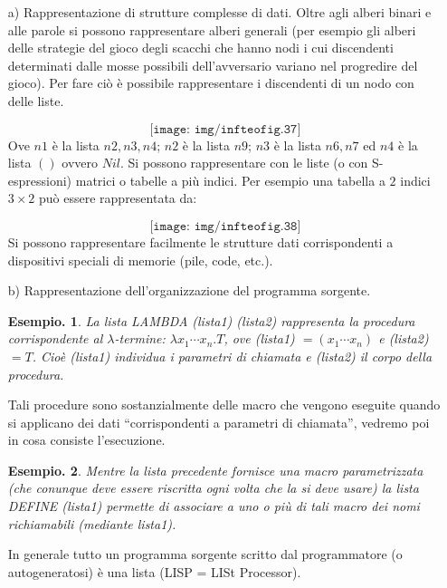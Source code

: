 \documentclass{book}
\newtheorem{esempio}{Esempio.}
\newcommand*{\lbt}{$\lambda$-ter\-mi\-ne}
\begin{document}
\begin{itemize}
\item[a)]Rappresentazione di strutture complesse di dati. Oltre agli alberi 
binari e alle parole si possono rappresentare alberi generali (per esempio gli 
alberi delle strategie del gioco degli scacchi che hanno nodi i cui discendenti
determinati dalle mosse possibili dell'avversario variano nel progredire del 
gioco). Per fare ci\`o \`e possibile rappresentare i discendenti di un nodo con
delle liste.

\[\texttt{[image: img/infteofig.37]}\]
Ove $n1$ \`e la lista $n2,n3,n4$; $n2$ \`e la lista $n9$; $n3$ \`e la lista 
$n6,n7$ ed $n4$ \`e la lista $()$ ovvero $Nil$.
Si possono rappresentare con le liste (o con S-espressioni) matrici o tabelle 
a pi\`u indici. Per esempio una tabella a $2$ indici $3 \times 2$ pu\`o essere
rappresentata da:


\[\texttt{[image: img/infteofig.38]}\]
Si possono rappresentare facilmente le strutture dati corrispondenti a 
dispositivi speciali di memorie (pile, code, etc.).
\item[b)]Rappresentazione dell'organizzazione del programma sorgente.
\begin{esempio}
La lista LAMBDA (lista1) (lista2) rappresenta la procedura corrispondente al
\lbt: $\lambda x_1 \cdots x_n.T$, ove (lista1) $= (x_1 \cdots x_n)$ e (lista2)
$= T$. Cio\`e (lista1) individua i parametri di chiamata e (lista2) il corpo 
della procedura.
\end{esempio}
Tali procedure sono sostanzialmente delle macro che vengono eseguite quando si 
applicano dei dati ``corrispondenti a parametri di chiamata'', vedremo poi in 
cosa consiste l'esecuzione.
\begin{esempio}
Mentre la lista precedente fornisce una macro parametrizzata (che conunque deve
essere riscritta ogni volta che la si deve usare) la lista DEFINE (lista1) 
permette di associare a uno o pi\`u di tali macro dei nomi richiamabili 
(mediante lista1).
\end{esempio}
In generale tutto un programma sorgente scritto dal programmatore (o 
autogeneratosi) \`e una lista (LISP = LISt Processor). 
\end{itemize}
\end{document}

